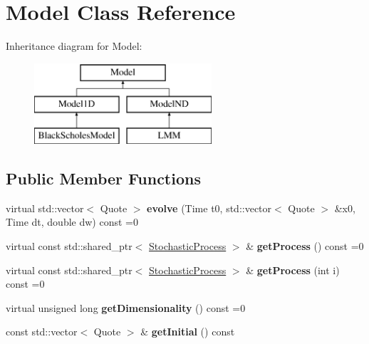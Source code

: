\hypertarget{class_model}{}\section{Model Class Reference}
\label{class_model}
Inheritance diagram for Model\+:\begin{figure}[H]
\begin{center}
\leavevmode
\includegraphics[height=3.000000cm]{class_model}
\end{center}
\end{figure}
\subsection*{Public Member Functions}
\begin{DoxyCompactItemize}
\item 
\hypertarget{class_model_a087d56280bb51e8b04be3a9a30d06c76}{}\label{class_model_a087d56280bb51e8b04be3a9a30d06c76} 
virtual std\+::vector$<$ Quote $>$ {\bfseries evolve} (Time t0, std\+::vector$<$ Quote $>$ \&x0, Time dt, double dw) const =0
\item 
\hypertarget{class_model_adc6a695d3f6b2def79f2dde69b3ab547}{}\label{class_model_adc6a695d3f6b2def79f2dde69b3ab547} 
virtual const std\+::shared\+\_\+ptr$<$ \hyperlink{class_stochastic_process}{Stochastic\+Process} $>$ \& {\bfseries get\+Process} () const =0
\item 
\hypertarget{class_model_a23adaaf21b2955a1f4d4893ad9b77f02}{}\label{class_model_a23adaaf21b2955a1f4d4893ad9b77f02} 
virtual const std\+::shared\+\_\+ptr$<$ \hyperlink{class_stochastic_process}{Stochastic\+Process} $>$ \& {\bfseries get\+Process} (int i) const =0
\item 
\hypertarget{class_model_acbe41cf30367bce4b96e92812d644f2d}{}\label{class_model_acbe41cf30367bce4b96e92812d644f2d} 
virtual unsigned long {\bfseries get\+Dimensionality} () const =0
\item 
\hypertarget{class_model_ade5d08aae4d32777bfa048f356bbcca9}{}\label{class_model_ade5d08aae4d32777bfa048f356bbcca9} 
const std\+::vector$<$ Quote $>$ \& {\bfseries get\+Initial} () const
\end{DoxyCompactItemize}
